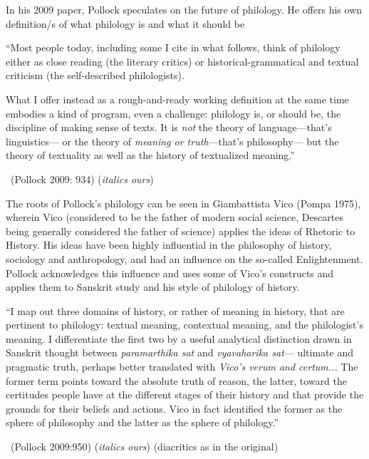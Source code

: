 In his 2009 paper, Pollock speculates on the future of philology. He offers his own definition/s of what philology is and what it should be

\begin{myquote}
“Most people today, including some I cite in what follows, think of philology either as close reading (the literary critics) or historical-grammatical and textual criticism (the self-described philologists).
\end{myquote}

\begin{myquote}
What I offer instead as a rough-and-ready working definition at the same time embodies a kind of program, even a challenge: philology is, or should be, the discipline of making sense of texts. It is \textit{not} the theory of language—that’s linguistics— or the theory of \textit{meaning or truth}—that’s philosophy— but the theory of textuality as well as the history of textualized meaning.”

~\hfill (Pollock 2009: 934) (\textit{italics ours})
\end{myquote}

The roots of Pollock’s philology can be seen in Giambattista Vico (Pompa 1975), wherein Vico (considered to be the father of modern social science, Descartes being generally considered the father of science) applies the ideas of Rhetoric to History. His ideas have been highly influential in the philosophy of history, sociology and anthropology, and had an influence on the so-called Enlightenment. Pollock acknowledges this influence and uses some of Vico’s constructs and applies them to Sanskrit study and his style of philology of history.

\begin{myquote}
“I map out three domains of history, or rather of meaning in history, that are pertinent to philology: textual meaning, contextual meaning, and the philologist’s meaning. I differentiate the first two by a useful analytical distinction drawn in Sanskrit thought between \textit{paramarthika sat} and \textit{vyavaharika sat}— ultimate and pragmatic truth, perhaps better translated with \textit{Vico’s verum and certum...} The former term points toward the absolute truth of reason, the latter, toward the certitudes people have at the different stages of their history and that provide the grounds for their beliefs and actions. Vico in fact identified the former as the sphere of philosophy and the latter as the sphere of philology.”

~\hfill (Pollock 2009:950) (\textit{italics ours}) (diacritics as in the original)
\end{myquote}

